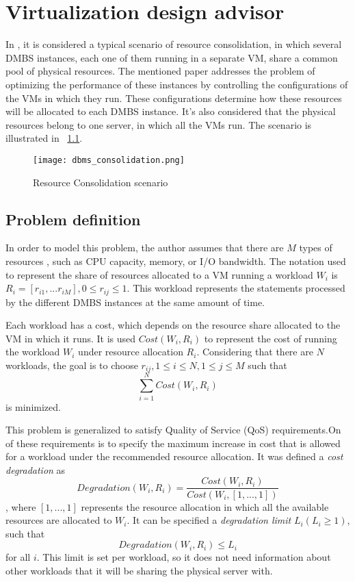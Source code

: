 \chapter{\textbf{Virtualization design advisor}}

\label{Virtualization design advisor}


In \cite{Soror:2008:AVM:1376616.1376711}, it is considered a typical scenario of resource consolidation, in which several DMBS instances, each one of them running in a separate VM, share a common pool of physical resources. The mentioned paper addresses the problem of optimizing the performance of these instances by controlling the configurations of the VMs in which they run. These configurations determine how these resources will be allocated to each DMBS instance. It's also considered that the physical resources belong to one server, in which all the VMs run. The scenario is illustrated in ~\ref{fig:scenario}.


\begin{figure}[ht]
\centering
\texttt{[image: dbms\_consolidation.png]}
\caption{Resource Consolidation scenario}
\label{fig:scenario}
\end{figure} 

\section{Problem definition}

In order to model this problem, the author assumes that there are  $M$ types of resources , such as CPU capacity, memory, or I/O bandwidth. The notation used to represent the share of resources allocated to a VM running a workload $W_{i}$ is $R_{i} = [r_{i1},...r_{iM}], 0 \leq r_{ij} \leq 1$. This workload represents the statements processed by the different DMBS instances at the same amount of time. 

Each workload has a cost, which depends on the resource share allocated to the VM in which it runs. It is used $Cost(W_{i},R_{i})$ to represent the cost of running the workload $W_{i}$ under resource allocation $R_{i}$. Considering that there are $N$ workloads, the goal is to choose $r_{ij}, 1 \leq i \leq N, 1 \leq j \leq M$ such that 
\[
  \sum_{i=1}^{N} Cost(W_{i},R_{i})
\]
is minimized.

This problem is generalized to satisfy Quality of Service (QoS) requirements.On of these requirements is to specify the maximum increase in cost that is allowed for a workload under the recommended resource allocation. It was defined a \textit{cost degradation} as
\[
 Degradation(W_{i},R_{i}) = \frac{Cost(W_{i},R_{i})}{Cost(W_{i},[1,...,1])}
\]
, where $[1,...,1]$ represents the resource allocation in which all the available resources are allocated to $W_{i}$. It can be specified a \textit{degradation limit} $L_{i} ( L_{i} \geq 1 )$, such that 
\[
 Degradation(W_{i}, R_{i}) \leq L_{i}
\]
for all $i$. This limit is set per workload, so it does not need information about other workloads that it will be sharing the physical server with.

